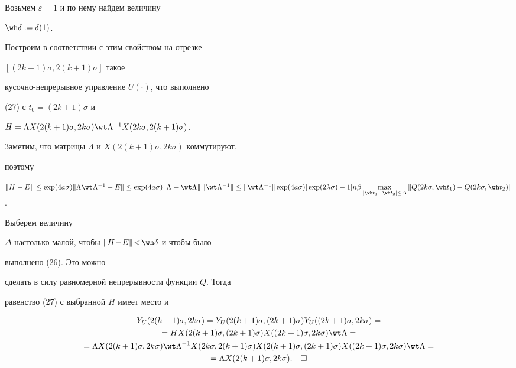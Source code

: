 Возьмем $\varepsilon=1$ и по нему найдем величину


$\wh\delta:=\delta(1)$.


Построим в соответствии с этим свойством на отрезке


$[(2k+1)\sigma,2(k+1)\sigma]$ такое


кусочно-непрерывное управление $U(\cdot)$, что выполнено


(27) с $t_{0}=(2k+1)\sigma$ и


$H=\Lambda X(2(k+1)\sigma,2k\sigma)\wt\Lambda^{-1}X(2k\sigma,2(k+1)\sigma)$.


Заметим, что матрицы $\Lambda$ и $X(2(k+1)\sigma,2k\sigma)$ коммутируют,


поэтому


$\|H-E\|\le\exp(4a\sigma)\|\Lambda\wt\Lambda^{-1}-E\|\le


\exp(4a\sigma)\|\Lambda-\wt\Lambda\|\,\|\wt\Lambda^{-1}\|\le


\|\wt\Lambda^{-1}\|\exp(4a\sigma)|\exp(2\lambda\sigma)-1|


n\beta \max\limits_{|\wh t_1-\wh t_2|\le\varDelta}


\|Q(2k\sigma,\wh t_1)-Q(2k\sigma,\wh t_2)\|$.


Выберем величину


$\varDelta$ настолько малой, чтобы $\|H\!-\!E\|\!<\!\wh\delta$ и чтобы было


выполнено (26). Это можно


сделать в силу равномерной непрерывности функции $Q$. Тогда


равенство (27) с выбранной $H$ имеет место и


\begin{multline*}


Y_{U}(2(k+1)\sigma,2k\sigma)=Y_{U}(2(k+1)\sigma,(2k+1)


\sigma)Y_{U}((2k+1)\sigma,2k\sigma)=\\


%


=HX(2(k+1)\sigma,(2k+1)\sigma)X((2k+1)\sigma,2k\sigma)\wt\Lambda =\\


%


=\Lambda X(2(k+1)\sigma,2k\sigma)\wt\Lambda^{-1}X(2k\sigma,2(k+1)\sigma)


X(2(k+1)\sigma,(2k+1)\sigma)X((2k+1)\sigma,2k\sigma)\wt\Lambda =\\


%


=\Lambda X(2(k+1)\sigma,2k\sigma).\quad\square


\end{multline*}





